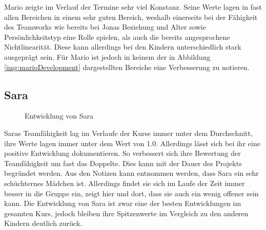 Mario zeigte im Verlauf der Termine sehr viel Konstanz. Seine Werte lagen in fast allen Bereichen in einem sehr guten Bereich, weshalb einerseits bei der Fähigkeit des Teamworks wie bereits bei Jonas Beziehung und Alter sowie Persönlichkeitstyp eine Rolle spielen, als auch die bereits angesprochene Nichtlinearität. Diese kann allerdings bei den Kindern unterschiedlich stark ausgeprägt sein. Für Mario ist jedoch in keinem der in Abbildung \ref{img:marioDevelopment} dargestellten Bereiche eine Verbesserung zu notieren.

\subsection*{Sara}
\begin{figure}[H]
	\centering
	\caption{Entwicklung von Sara}
	\label{img:saraDevelopment}
\end{figure}
Saras Teamfähigkeit lag im Verlaufe der Kurse immer unter dem Durchschnitt, ihre Werte lagen immer unter dem Wert von 1.0. Allerdings lässt sich bei ihr eine positive Entwicklung dokumentieren. So verbessert sich ihre Bewertung der Teamfähigkeit um fast das Doppelte. Dies kann mit der Dauer des Projekts begründet werden. Aus den Notizen kann entnommen werden, dass Sara ein sehr schüchternes Mädchen ist. Allerdings findet sie sich im Laufe der Zeit immer besser in die Gruppe ein, zeigt hier und dort, dass sie auch ein wenig offener sein kann. Die Entwicklung von Sara ist zwar eine der besten Entwicklungen im gesamten Kurs, jedoch bleiben ihre Spitzenwerte im Vergleich zu den anderen Kindern deutlich zurück.\\
